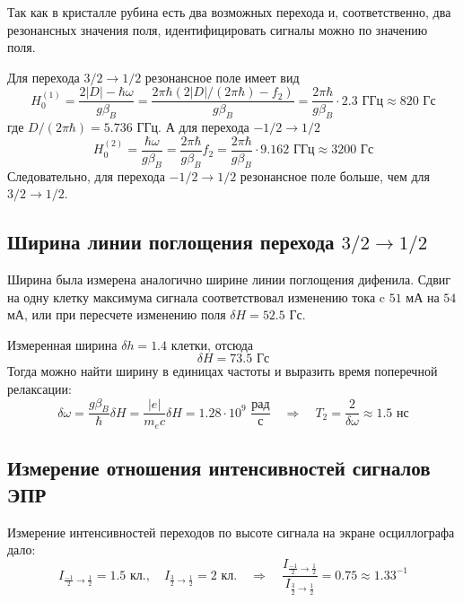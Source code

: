 \documentclass[a4paper,14pt]{extarticle}
\begin{document}

Так как в кристалле рубина есть два возможных перехода и, соответственно, два резонансных значения поля, идентифицировать сигналы можно по значению поля. 

Для перехода $3/2 \rightarrow 1/2$ резонансное поле имеет вид \cite[стр. 24]{mar}
\begin{equation}
  H_0^{(1)} = \frac{2|D| - \hbar\omega}{g\beta_B} = 
              \frac{2\pi\hbar(2|D|/(2\pi\hbar) - f_2)}{g\beta_B}=
              \frac{2\pi\hbar}{g\beta_B}\cdot 2.3 \text{ ГГц}\approx 820 \text{ Гс}
\end{equation}
где $D/(2\pi \hbar)=5.736\text{ ГГц}$.
А для перехода $-1/2 \rightarrow 1/2$ \cite[там же]{mar}
\begin{equation}
  H_0^{(2)} = \frac{\hbar\omega}{g\beta_B} = \frac{2\pi\hbar}{g\beta_B}f_2 =
  \frac{2\pi\hbar}{g\beta_B}\cdot 9.162 \text{ ГГц}\approx 3200 \text{ Гс}
\end{equation}
Следовательно, для перехода $-1/2 \rightarrow 1/2$ резонансное поле больше, чем для $3/2 \rightarrow 1/2$.


\subsection{Ширина линии поглощения перехода $3/2 \rightarrow 1/2$}
Ширина была измерена аналогично ширине линии поглощения дифенила. Сдвиг на одну клетку максимума сигнала соответствовал изменению тока c $51$ мА на $54$ мА, или при пересчете изменению поля $\delta H = 52.5$ Гс. 

Измеренная ширина $\delta h=1.4$ клетки, отсюда
\begin{equation} 
   \delta H = 73.5 \text{ Гс}
 \end{equation} 
Тогда можно найти ширину в единицах частоты и выразить время поперечной релаксации:
 \begin{equation}
  \delta \omega = \frac{g\beta_B}{\hbar} \delta H = \frac{|e|}{m_e c} \delta H = 1.28 \cdot 10^9 \,\,\frac{\text{рад}}{\text{с}}
  \quad \Rightarrow \quad
  T_2 = \frac{2}{\delta \omega} \approx 1.5 \text{ нс}
\end{equation}

\subsection{Измерение отношения интенсивностей сигналов ЭПР}

Измерение интенсивностей переходов по высоте сигнала на экране осциллографа дало:
\begin{equation}
  I_{\frac{-1}{2}\to\frac12} = 1.5 \text{ кл.}, \quad
  I_{\frac{3}{2}\to\frac12} = 2 \text{ кл.} 
  \quad \Rightarrow \quad
  \frac{I_{\frac{-1}{2}\to\frac12}}{I_{\frac{3}{2}\to\frac12}}=0.75\approx 1.33^{-1}
\end{equation}
\end{document}

